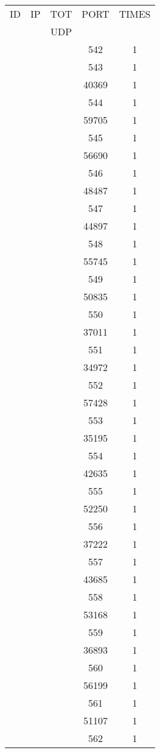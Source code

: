\documentclass[a4paper]{scrartcl}
\begin{document}
\begin{minipage}[b]{0.5\linewidth}
\begin{tabular}{| c | c | c | c | c |}
\hline
ID & IP & TOT & PORT & TIMES \\ 
   &    & UDP &      &       \\ 
\hline
& & & 542 & 1 \\ & & & 543 & 1 \\ & & & 40369 & 1 \\ & & & 544 & 1 \\ & & & 59705 & 1 \\ & & & 545 & 1 \\ & & & 56690 & 1 \\ & & & 546 & 1 \\ & & & 48487 & 1 \\ & & & 547 & 1 \\ & & & 44897 & 1 \\ & & & 548 & 1 \\ & & & 55745 & 1 \\ & & & 549 & 1 \\ & & & 50835 & 1 \\ & & & 550 & 1 \\ & & & 37011 & 1 \\ & & & 551 & 1 \\ & & & 34972 & 1 \\ & & & 552 & 1 \\ & & & 57428 & 1 \\ & & & 553 & 1 \\ & & & 35195 & 1 \\ & & & 554 & 1 \\ & & & 42635 & 1 \\ & & & 555 & 1 \\ & & & 52250 & 1 \\ & & & 556 & 1 \\ & & & 37222 & 1 \\ & & & 557 & 1 \\ & & & 43685 & 1 \\ & & & 558 & 1 \\ & & & 53168 & 1 \\ & & & 559 & 1 \\ & & & 36893 & 1 \\ & & & 560 & 1 \\ & & & 56199 & 1 \\ & & & 561 & 1 \\ & & & 51107 & 1 \\ & & & 562 & 1 \\ \hline\end{tabular}\end{minipage} \hfill\begin{minipage}[b]{0.5\linewidth}\begin{tabular}{| c | c | c | c | c |}

\end{tabular}
\end{minipage}
\end{document}
